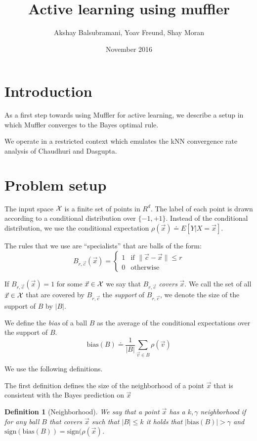 \documentclass{article}
\title{Active learning using muffler}
\author{Akshay Balsubramani, Yoav Freund, Shay Moran}
\date{November 2016}
\newtheorem{definition}[theorem]{Definition}
\newcommand{\X}{{\cal X}}
\newcommand{\x}{\vec{x}}
\newcommand{\vv}{\vec{v}}
\newcommand{\cc}{\vec{c}}
\newcommand{\bias}{\text{bias}}
\newcommand{\sign}{\text{sign}}
\begin{document}
\maketitle

\section{Introduction}

As a first step towards using Muffler for active learning, we describe
a setup in which Muffler converges to the Bayes optimal rule.

We operate in a restricted context which emulates the kNN 
convergence rate analysis of Chaudhuri and Dasgupta.

\section{Problem setup}

The input space $\X$ is a finite set of points in $R^d$.
The label of each point is drawn according to a conditional
distribution over $\{-1,+1\}$. Instead of the conditional
distribution, we use the conditional expectation
$\rho(\x) \doteq E[Y | X=\x]$.

The rules that we use are ``specialists'' that are balls of the form:
\[
B_{r,\cc}(\x) =
\begin{cases}
 1 & \text{if } \| \cc- \x \| \leq r \\
 0 & \text{otherwise }
\end{cases}
\]

If $B_{r,\cc}(\x) =1$ for some $\x \in \X$ we say that $B_{r,\cc}$
{\em covers} $\x$. We call the set of all $\x \in \X$ that are covered
by $B_{r,\cc}$ the {\em support} of $B_{r,\cc}$, we denote the size of
the support of $B$ by $|B|$.

We define the {\em bias} of a ball $B$ as the average of the
conditional expectations over the support of $B$.
$$
\bias(B) \doteq \frac{1}{|B|} \sum_{\vv \in B} \rho(\vv)
$$

We use the following definitions.

The first definition defines the size of the neighborhood of a point $\x$ that is
consistent with the Bayes prediction on $\x$
\begin{definition}[Neighborhood]
We say that a point $\x$ has a $k,\gamma$ neighborhood if for any ball $B$ that
covers $\x$ such that $|B| \leq k$ it holds that $|\bias(B)| > \gamma$
and $\sign(\bias(B))=\sign(\rho(\x)$. 
\end{definition}
\end{document}
